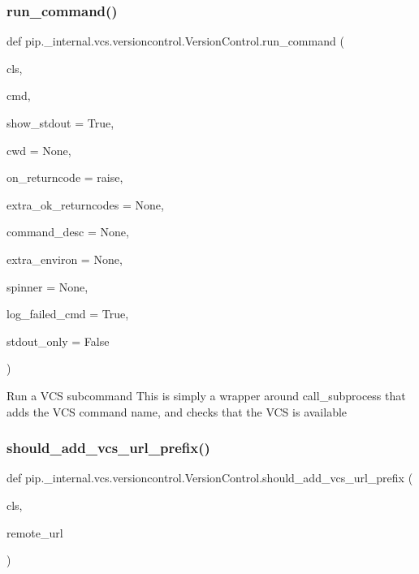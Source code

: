 \subsubsection{\texorpdfstring{run\+\_\+command()}{run\_command()}}
{\footnotesize\ttfamily def pip.\+\_\+internal.\+vcs.\+versioncontrol.\+Version\+Control.\+run\+\_\+command (\begin{DoxyParamCaption}\item[{}]{cls,  }\item[{}]{cmd,  }\item[{}]{show\+\_\+stdout = {\ttfamily True},  }\item[{}]{cwd = {\ttfamily None},  }\item[{}]{on\+\_\+returncode = {\ttfamily \textquotesingle{}raise\textquotesingle{}},  }\item[{}]{extra\+\_\+ok\+\_\+returncodes = {\ttfamily None},  }\item[{}]{command\+\_\+desc = {\ttfamily None},  }\item[{}]{extra\+\_\+environ = {\ttfamily None},  }\item[{}]{spinner = {\ttfamily None},  }\item[{}]{log\+\_\+failed\+\_\+cmd = {\ttfamily True},  }\item[{}]{stdout\+\_\+only = {\ttfamily False} }\end{DoxyParamCaption})}

\begin{DoxyVerb}Run a VCS subcommand
This is simply a wrapper around call_subprocess that adds the VCS
command name, and checks that the VCS is available
\end{DoxyVerb}
 \mbox{\label{classpip_1_1__internal_1_1vcs_1_1versioncontrol_1_1VersionControl_a8110f667d528e6eefaec84f03c45a119}} 
\subsubsection{\texorpdfstring{should\+\_\+add\+\_\+vcs\+\_\+url\+\_\+prefix()}{should\_add\_vcs\_url\_prefix()}}
{\footnotesize\ttfamily def pip.\+\_\+internal.\+vcs.\+versioncontrol.\+Version\+Control.\+should\+\_\+add\+\_\+vcs\+\_\+url\+\_\+prefix (\begin{DoxyParamCaption}\item[{}]{cls,  }\item[{}]{remote\+\_\+url }\end{DoxyParamCaption})}

